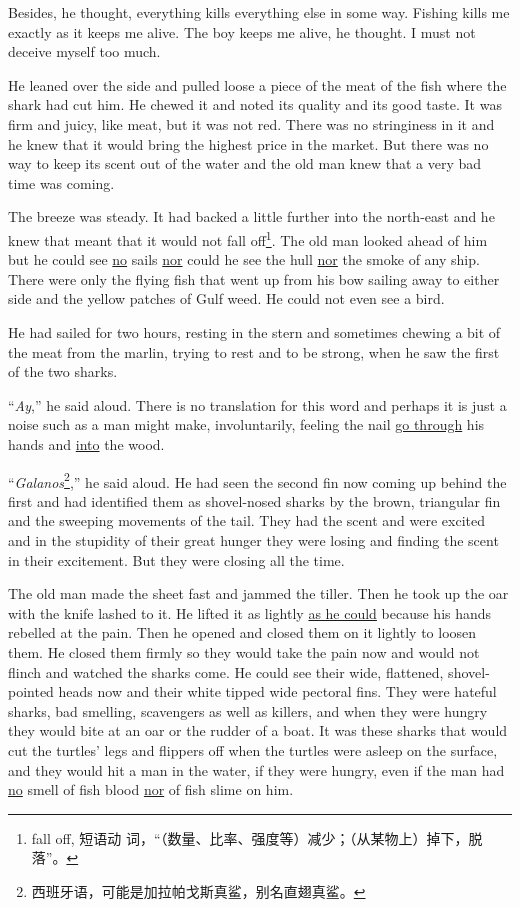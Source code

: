 Besides, he thought, everything kills everything else in some way. Fishing
kills me exactly as it keeps me alive. The boy keeps me alive, he thought. I
must not \gls{deceive} myself too much.

He leaned over the side and pulled loose a piece of the meat of the fish
where the shark had cut him. He chewed it and noted its \gls{quality} and its
good taste. It was firm and juicy, like meat, but it was not red. There was
no \gls{stringiness} in it and he knew that it would bring the highest price
in the market. But there was no way to keep its scent out of the water and
the old man knew that a very bad time was coming.

The breeze was steady. It had backed a little further into the north-east
and he knew that meant that it would not fall off\footnote{fall off, 短语动
  词，“（数量、比率、强度等）减少；（从某物上）掉下，脱落”。}. The old man
looked ahead of him but he could see \uline{no} sails \uline{nor} could he see the
\gls{hull} \uline{nor} the smoke of any ship. There were only the flying fish that
went up from his bow sailing away to either side and the yellow patches of
Gulf weed. He could not even see a bird.

He had sailed for two hours, resting in the stern and sometimes chewing a
bit of the meat from the marlin, trying to rest and to be strong, when he
saw the first of the two sharks.

``\emph{Ay},'' he said aloud. There is no \gls{translation} for this word and
perhaps it is just a noise such as a man might make, \gls{involuntarily},
feeling the \gls{nail} \uline{go through} his hands and \uline{into} the wood.

``\emph{Galanos}\footnote{西班牙语，可能是加拉帕戈斯真鲨，别名直翅真鲨。},'' he
said aloud. He had seen the second fin now coming up behind the first and
had \gls{identified} them as \gls{shovel}-nosed sharks by the brown,
\gls{triangular} fin and the \gls{sweeping} movements of the tail. They had the
scent and were excited and in the \gls{stupidity} of their great hunger they
were losing and finding the scent in their \gls{excitement}. But they were
closing all the time.

The old man made the sheet fast and \gls{jammed} the tiller. Then he took up
the oar with the knife lashed to it. He lifted it as lightly \uline{as he could}
because his hands \gls{rebelled} at the pain. Then he opened and closed them
on it lightly to loosen them. He closed them firmly so they would take the
pain now and would not \gls{flinch} and watched the sharks come. He could
see their wide, flattened, shovel-pointed heads now and their white
tipped wide pectoral fins. They were \gls{hateful} sharks, bad
smelling, scavengers as well as killers, and when they were hungry they
would bite at an oar or the \gls{rudder} of a boat. It was these sharks that would
cut the turtles' legs and \glspl{flipper} off when the turtles were asleep
on the surface, and they would hit a man in the water, if they were hungry,
even if the man had \uline{no} smell of fish blood \uline{nor} of fish \gls{slime} on him.

